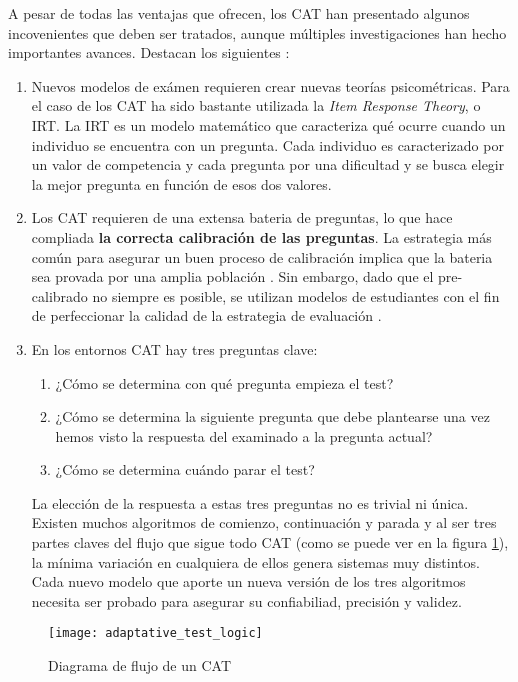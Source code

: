 A pesar de todas las ventajas que ofrecen, los \acrshort{CAT} han presentado algunos incovenientes que deben ser tratados, aunque múltiples investigaciones han hecho importantes avances. Destacan los siguientes \cite{Wainer00}:

\begin{enumerate}
 	\item Nuevos modelos de exámen requieren crear nuevas teorías psicométricas. Para el caso de los \acrshort{CAT} ha sido bastante utilizada la \textit{Item Response Theory}, o \acrshort{IRT}. La \acrshort{IRT} es un modelo matemático que caracteriza qué ocurre cuando un individuo se encuentra con un pregunta. Cada individuo es caracterizado por un valor de competencia y cada pregunta por una dificultad y se busca elegir la mejor pregunta en función de esos dos valores\cite{Wainer83}.
	\item Los \acrshort{CAT} requieren de una extensa bateria de preguntas, lo que hace compliada \textbf{la correcta calibración de las preguntas}. La estrategia más común para asegurar un buen proceso de calibración implica que la bateria sea provada por una amplia población \cite{Klinkenberg11}. Sin embargo, dado que el pre-calibrado no siempre es posible, se utilizan modelos de estudiantes con el fin de perfeccionar la calidad de la estrategia de evaluación \cite{Antal11}\cite{Galvez09}\cite{Molins14Test}.
	\item En los entornos \acrshort{CAT} hay tres preguntas clave:
	\begin{enumerate}
		\item ¿Cómo se determina con qué pregunta empieza el test?
		\item ¿Cómo se determina la siguiente pregunta que debe plantearse una vez hemos visto la respuesta del examinado a la pregunta actual?
		\item ¿Cómo se determina cuándo parar el test?
	\end{enumerate}
	La elección de la respuesta a estas tres preguntas no es trivial ni única. Existen muchos algoritmos de comienzo, continuación y parada y al ser tres partes claves del flujo que sigue todo \acrshort{CAT} (como se puede ver en la figura \ref{fig:diagrama_flujo_CAT}), la mínima variación en cualquiera de ellos genera sistemas muy distintos. Cada nuevo modelo que aporte un nueva versión de los tres algoritmos necesita ser probado para asegurar su confiabiliad, precisión y validez\cite{Wainer00}.
\end{enumerate}

\begin{figure}[htp!]
	\centering
	\texttt{[image: adaptative\_test\_logic]}
	\caption{Diagrama de flujo de un \acrshort{CAT}}
	\label{fig:diagrama_flujo_CAT}
\end{figure}






